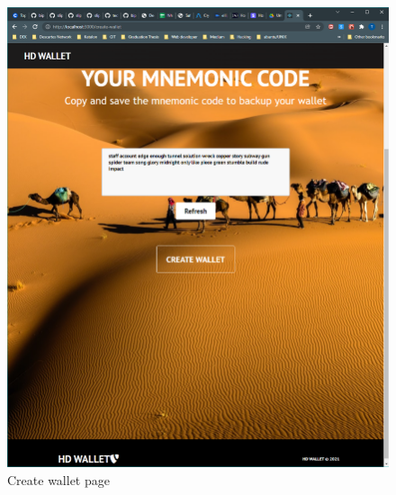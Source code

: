   \begin{figure}[h!]
    \centering
    \includegraphics[width=1\textwidth]{images/CreateWallet.png}
    \caption[Create wallet page]{Create wallet page}
    \label{fig:createwallet}
  \end{figure}



